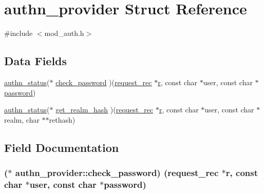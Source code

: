 \hypertarget{structauthn__provider}{}\section{authn\+\_\+provider Struct Reference}
\label{structauthn__provider}


{\ttfamily \#include $<$mod\+\_\+auth.\+h$>$}

\subsection*{Data Fields}
\begin{DoxyCompactItemize}
\item 
\hyperlink{mod__auth_8h_aa12eae791b92d13bc8ec6842e3403b9a}{authn\+\_\+status}($\ast$ \hyperlink{structauthn__provider_ad46c14875d72cc199749da5d53f97b05}{check\+\_\+password} )(\hyperlink{structrequest__rec}{request\+\_\+rec} $\ast$\hyperlink{pcregrep_8txt_a2e9e9438b26c0bb4425367a7e4f75eb3}{r}, const char $\ast$user, const char $\ast$\hyperlink{testpass_8c_aa4a2ebcb494493f648ae1e6975672575}{password})
\item 
\hyperlink{mod__auth_8h_aa12eae791b92d13bc8ec6842e3403b9a}{authn\+\_\+status}($\ast$ \hyperlink{structauthn__provider_a982a3f69a8787c09d73db0befa67a6f3}{get\+\_\+realm\+\_\+hash} )(\hyperlink{structrequest__rec}{request\+\_\+rec} $\ast$\hyperlink{pcregrep_8txt_a2e9e9438b26c0bb4425367a7e4f75eb3}{r}, const char $\ast$user, const char $\ast$realm, char $\ast$$\ast$rethash)
\end{DoxyCompactItemize}


\subsection{Field Documentation}
\subsubsection[{\texorpdfstring{check\+\_\+password}{check_password}}]{($\ast$ authn\+\_\+provider\+::check\+\_\+password) ({\bf request\+\_\+rec} $\ast${\bf r}, const char $\ast$user, const char $\ast${\bf password})}\hypertarget{structauthn__provider_ad46c14875d72cc199749da5d53f97b05}{}\label{structauthn__provider_ad46c14875d72cc199749da5d53f97b05}
